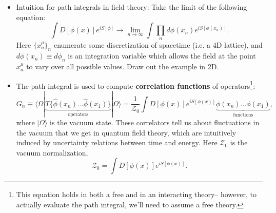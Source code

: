 \documentclass[12pt, oneside]{article}   	%
\theoremstyle{definition}
\begin{document}
\begin{itemize}

	\item Intuition for path integrals in field theory: Take the limit of the following equation:
	\begin{equation}
		\int D [\phi(x)] e^{i S[\phi]} \longrightarrow \lim_{n\rightarrow\infty} \int \prod_n d \phi(x_n) e^{i S[\phi(x_n)]}.
	\end{equation}
	Here $\{x^\mu_n\}_{n}$ enumerate some discretization of spacetime (i.e. a 4D lattice), and $d\phi(x_n)\equiv d\phi_n$ is an integration variable which allows the field at the point $x_n^\mu$ to vary over all possible values. Draw out the example in 2D. 

	\item The path integral is used to compute \textbf{correlation functions} of operators\footnote{This equation holds in both a free and in an interacting theory-- however, to actually evaluate the path integral, we'll need to assume a free theory.}:
	\begin{equation}
		G_n\equiv \langle\Omega | \underbrace{T\{\hat{\phi}(x_n) ... \hat{\phi}(x_1) \}}_{\mathrm{operators}} |\Omega\rangle = \frac{1}{\mathcal Z_0} \int D[\phi(x)] e^{i S[\phi(x)]} \underbrace{\phi(x_n) ... \phi(x_1)}_{\mathrm{functions}},
	\end{equation}
	where $|\Omega\rangle$ is the vacuum state. These correlators tell us about fluctuations in the vacuum that we get in quantum field theory, which are intuitively induced by uncertainty relations between time and energy. Here $\mathcal Z_0$ is the vacuum normalization,
	\begin{equation}
		\mathcal Z_0 = \int D[\phi(x)] e^{i S[\phi(x)]}.
	\end{equation}


\end{itemize}
\end{document}
